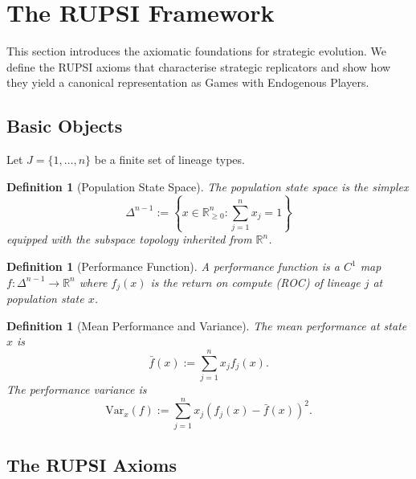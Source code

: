 \documentclass[12pt]{article}
\newtheorem{definition}[theorem]{Definition}
\newcommand{\R}{\mathbb{R}}
\newcommand{\Var}{\mathrm{Var}}
\begin{document}

\section{The RUPSI Framework}
\label{sec:rupsi}

This section introduces the axiomatic foundations for strategic evolution. We define the RUPSI axioms that characterise strategic replicators and show how they yield a canonical representation as Games with Endogenous Players.

\subsection{Basic Objects}

Let $J = \{1, \ldots, n\}$ be a finite set of lineage types.

\begin{definition}[Population State Space]
The population state space is the simplex
\[
\Delta^{n-1} := \left\{ x \in \R^n_{\geq 0} : \sum_{j=1}^n x_j = 1 \right\}
\]
equipped with the subspace topology inherited from $\R^n$.
\end{definition}

\begin{definition}[Performance Function]
A \emph{performance function} is a $C^1$ map $f: \Delta^{n-1} \to \R^n$ where $f_j(x)$ is the return on compute (ROC) of lineage $j$ at population state $x$.
\end{definition}

\begin{definition}[Mean Performance and Variance]
The \emph{mean performance} at state $x$ is
\[
\bar{f}(x) := \sum_{j=1}^n x_j f_j(x).
\]
The \emph{performance variance} is
\[
\Var_x(f) := \sum_{j=1}^n x_j (f_j(x) - \bar{f}(x))^2.
\]
\end{definition}

\subsection{The RUPSI Axioms}
\end{document}

